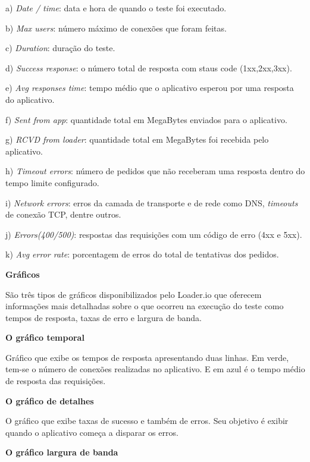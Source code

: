   \begin{compactitem}
    \item[a)] \textit{Date / time}: data e hora de quando o teste foi executado.
    \item[b)] \textit{Max users}: número máximo de conexões que foram feitas.
    \item[c)] \textit{Duration}:  duração do teste.
    \item[d)] \textit{Success response}: o número total de resposta com staus code (1xx,2xx,3xx).
    \item[e)] \textit{Avg responses time}: tempo médio que o aplicativo esperou por uma resposta do aplicativo.
    \item[f)] \textit{Sent from app}: quantidade total em MegaBytes enviados para o aplicativo.
    \item[g)] \textit{RCVD from loader}: quantidade total em MegaBytes foi recebida pelo aplicativo.
    \item[h)] \textit{Timeout errors}: número de pedidos que não receberam uma resposta dentro do tempo limite configurado.
    \item[i)] \textit{Network errors}: erros da camada de transporte e de rede como \ac{DNS}, \textit{timeouts} de conexão TCP, dentre outros.
    \item[j)] \textit{Errors(400/500)}: respostas das requisições com um código de erro (4xx e 5xx).
    \item[k)] \textit{Avg error rate}: porcentagem de erros do total de tentativas dos pedidos.
  \end{compactitem}

  \textbf{Gráficos}
  
  São três tipos de gráficos disponibilizados pelo Loader.io que oferecem informações mais detalhadas 
  sobre o que ocorreu na execução do teste como tempos de resposta, taxas de erro e largura de banda.
  
  \textbf{O gráfico temporal}
  
  Gráfico que exibe os tempos de resposta apresentando duas linhas. Em verde, tem-se o 
  número de conexões realizadas no aplicativo. E em azul é o tempo médio de resposta das requisições.
  
  \textbf{O gráfico de detalhes} 
  
  O gráfico que exibe taxas de sucesso e também de erros. Seu objetivo é exibir quando o aplicativo
  começa a disparar os erros. 
  
  \textbf{O gráfico largura de banda} 
  
